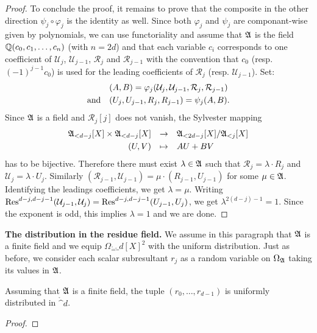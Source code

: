 \documentclass{sig-alternate}
\begin{document}
\begin{proof}
To conclude the proof, it remains to prove that the composite in 
the other direction $\psi_j \circ \varphi_j$ is the identity as well. 
Since both $\varphi_j$ and $\psi_j$ are componant-wise given by 
polynomials, we can use functoriality and assume that $\mathfrak A$ is 
the field $\mathbb Q(c_0, c_1, \ldots, c_n)$ (with $n = 2d$) and that 
each variable $c_i$ corresponds to one coefficient of $\mathcal U_j$, 
$\mathcal U_{j-1}$, $\mathcal R_j$ and $\mathcal R_{j-1}$ with the
convention that $c_0$ (resp. $(-1)^{j-1} c_0$) is used for the leading
coefficients of $\mathcal R_j$ (resp. $\mathcal U_{j-1}$). Set:
$$\begin{array}{ll}
& (A,B) = \varphi_j(\mathcal U_j, \mathcal U_{j-1}, 
\mathcal R_j, \mathcal R_{j-1}) \smallskip \\
\text{and} & (U_j, U_{j-1}, R_j, R_{j-1}) = \psi_j(A,B).
\end{array}$$
Since $\mathfrak A$ is a field and $\mathcal R_j[j]$ does not vanish, the 
Sylvester mapping
$$\begin{array}{rcl}
\ring_{<d-j}[X] \times \ring_{<d-j}[X] & \to & 
\ring_{<2d-j}[X]/\ring_{<j}[X] \smallskip \\
(U,V) & \mapsto & AU + BV
\end{array}$$
has to be bijective. Therefore there must exist $\lambda \in \mathfrak A$ 
such that $\mathcal R_j = \lambda \cdot R_j$ and $\mathcal U_j = \lambda 
\cdot U_j$. Similarly $(\mathcal R_{j-1}, \mathcal U_{j-1}) = \mu \cdot
(R_{j-1}, U_{j-1})$ for some $\mu \in \mathfrak A$. Identifying the leadings 
coefficients, we get $\lambda = \mu$. Writing
$\text{\rm Res}^{d-j,d-j-1}(\mathcal U_{j-1}, \mathcal U_j) = 
\text{\rm Res}^{d-j,d-j-1}(U_{j-1}, U_j)$,
we get $\lambda^{2(d-j)-1} = 1$. Since the exponent is odd, this implies 
$\lambda = 1$ and we are done.
\end{proof}

\noindent 
\textbf{The distribution in the residue field.}
We assume in this paragraph that $\mathfrak A$ is a finite field and we equip 
$\Omega_\ring = \ring_d[X]^2$ with the uniform distribution. Just as 
before, we consider each scalar subresultant $r_j$ as a random variable 
on $\Omega_\mathfrak A$ taking its values in $\mathfrak A$.

\begin{prop}
\label{prop:distribk}
Assuming that $\mathfrak A$ is a finite field, the tuple $(r_0, \ldots, 
r_{d-1})$ is uniformly distributed in $\ring^d$.
\end{prop}

\begin{proof}
\end{proof}
\end{document}

